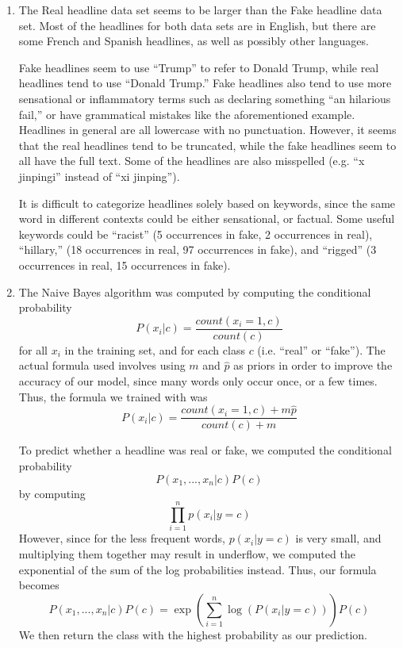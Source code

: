 \documentclass[10pt,letterpaper]{article}
\begin{document}
	\begin{enumerate}
		\item %
		The Real headline data set seems to be larger than the Fake headline data set.
		Most of the headlines for both data sets are in English, but there are some French and Spanish headlines, as well as possibly other languages.

		Fake headlines seem to use ``Trump'' to refer to Donald Trump, while real headlines tend to use ``Donald Trump.''
		Fake headlines also tend to use more sensational or inflammatory terms such as declaring something ``an hilarious fail,'' or have grammatical mistakes like the aforementioned example.
		Headlines in general are all lowercase with no punctuation.
		However, it seems that the real headlines tend to be truncated, while the fake headlines seem to all have the full text.
		Some of the headlines are also misspelled (e.g. ``x jinpingi'' instead of ``xi jinping'').

		It is difficult to categorize headlines solely based on keywords, since the same word in different contexts could be either sensational, or factual.
		Some useful keywords could be ``racist'' (5 occurrences in fake, 2 occurrences in real), ``hillary,'' (18 occurrences in real, 97 occurrences in fake), and ``rigged'' (3 occurrences in real, 15 occurrences in fake).

		\item %
		The Naive Bayes algorithm was computed by computing the conditional probability
		\[
			P(x_i | c) =  \frac{count(x_i = 1, c)}{count(c)}
		\]
		for all $x_i$ in the training set, and for each class $c$ (i.e. ``real'' or ``fake'').
		The actual formula used involves using $m$ and $\hat{p}$ as priors in order to improve the accuracy of our model, since many words only occur once, or a few times.
		Thus, the formula we trained with was
		\[
			P(x_i | c) =  \frac{count(x_i = 1, c) + m\hat{p}}{count(c) + m}
		\]

		To predict whether a headline was real or fake, we computed the conditional probability
		\[P(x_1, ..., x_n | c) P(c)\]
		by computing
		\[\prod_{i = 1}^{n}p(x_i|y=c)\]
		However, since for the less frequent words, $p(x_i|y=c)$ is very small, and multiplying them together may result in underflow, we computed the exponential of the sum of the log probabilities instead.
		Thus, our formula becomes
		\[
			P(x_1, ..., x_n | c) P(c) = \exp\left(\sum_{i = 1}^{n}\log(P(x_i|y=c))\right)P(c)
		\]
		We then return the class with the highest probability as our prediction.


\end{enumerate}
\end{document}
